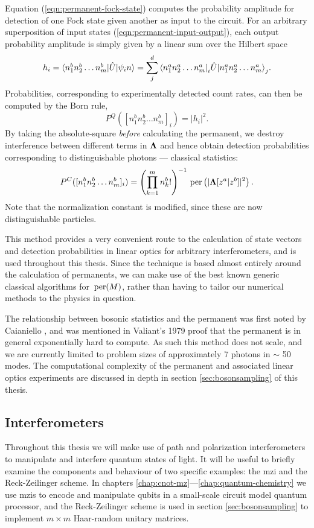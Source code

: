 Equation (\ref{eqn:permanent-fock-state}) computes the probability amplitude for detection of one Fock state given another as input to the circuit. For an arbitrary superposition of input states (\ref{eqn:permanent-input-output}), each output probability amplitude is simply given by a linear sum over the Hilbert space
\begin{equation}
    h_i = \mbox{$ \langle n_1^b n_2^b \ldots n_m^b | $} \hat{U} \mbox{$ | \psi_in \rangle $} = 
    \sum_j^d
    \mbox{$ \langle n_1^a n_2^a \ldots n_m^a | $}_i \hat{U} \mbox{$ | n_1^a n_2^a \ldots n_m^a \rangle $}_j.
\end{equation}
Probabilities, corresponding to experimentally detected count rates, can then be computed by the Born rule,
\begin{equation}
    P^Q([n_1^b n_2^b \ldots n_m^b]_i) = |h_i|^2.
\end{equation}
By taking the absolute-square \emph{before} calculating the permanent, we destroy interference between different terms in $\mathbf{\Lambda}$ and hence obtain detection probabilities corresponding to distinguishable photons --- classical statistics:
\begin{equation}
    P^C([n_1^b n_2^b \ldots n_m^b]_i) =
    \left(\prod_{k=1}^m n_k^b! \right)^{-1}
    \,\mathrm{per} \left( |\mathbf{\Lambda}[z^a | z^b] |^2 \right).
    \label{eqn:permanent-probabilities}
\end{equation}
Note that the normalization constant is modified, since these are now distinguishable particles.

This method provides a very convenient route to the calculation of state vectors and detection probabilities in linear optics for arbitrary interferometers, and is used throughout this thesis. Since the technique is based almost entirely around the calculation of permanents, we can make use of the best known generic classical algorithms for $\,\mathrm{per}(M)$, rather than having to tailor our numerical methods to the physics in question.

The relationship between bosonic statistics and the permanent was first noted by Caianiello \cite{Caianiello1953}, and was mentioned in Valiant's 1979 proof \cite{Valiant1979a} that the permanent is in general exponentially hard to compute. As such this method does not scale, and we are currently limited to problem sizes of approximately 7 photons in $\sim$ 50 modes. The computational complexity of the permanent and associated linear optics experiments are discussed in depth in section \ref{sec:bosonsampling} of this thesis.


\subsection{Interferometers}
Throughout this thesis we will make use of path and polarization interferometers to manipulate and interfere quantum states of light. It will be useful to briefly examine the components and behaviour of two specific examples: the \gls{mzi} and the Reck-Zeilinger scheme. In chapters \ref{chap:cnot-mz}---\ref{chap:quantum-chemistry} we use \glspl{mzi} to encode and manipulate qubits in a small-scale circuit model quantum processor, and the Reck-Zeilinger scheme is used in section \ref{sec:bosonsampling} to implement $m\times m$ Haar-random unitary matrices.

